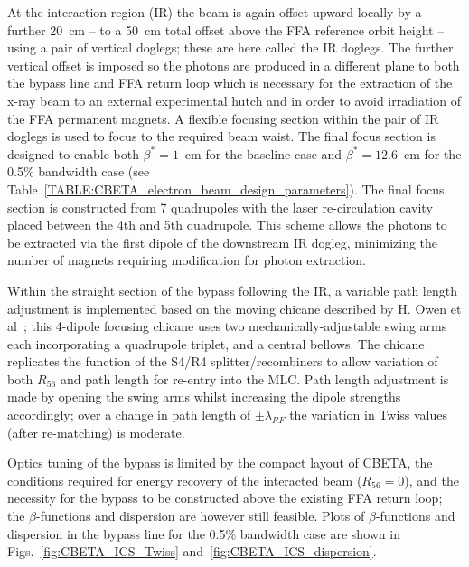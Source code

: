 \documentclass[../main.tex]{subfiles}
\begin{document}
At the interaction region (IR) the beam is again offset upward locally by a further 20~\si{\centi\meter} -- to a 50~\si{\centi\meter} total offset above the FFA reference orbit height -- using a pair of vertical doglegs; these are here called the IR doglegs. The further vertical offset is imposed so the photons are produced in a different plane to both the bypass line and FFA return loop which is necessary for the extraction of the x-ray beam to an external experimental hutch and in order to avoid irradiation of the FFA permanent magnets. A flexible focusing section within the pair of IR doglegs is used to focus to the required beam waist. The final focus section is designed to enable both $\beta^{*} = 1$~\si{\centi\meter} for the baseline case and $\beta^{*} = 12.6$~\si{\centi\meter} for the 0.5\% bandwidth case (see Table~\ref{TABLE:CBETA_electron_beam_design_parameters}). The final focus section is constructed from 7 quadrupoles with the laser re-circulation cavity placed between the 4th and 5th quadrupole. This scheme allows the photons to be extracted via the first dipole of the downstream IR dogleg, minimizing the number of magnets requiring modification for photon extraction. 

Within the straight section of the bypass following the IR, a variable path length adjustment is implemented based on the moving chicane described by H. Owen et al~\cite{owen2012modular}; this 4-dipole focusing chicane uses two mechanically-adjustable swing arms each incorporating a quadrupole triplet, and a central bellows. The chicane replicates the function of the S4/R4 splitter/recombiners to allow variation of both $R_{56}$ and path length for re-entry into the MLC. Path length adjustment is made by opening the swing arms whilst increasing the dipole strengths accordingly; over a change in path length of $\pm\lambda_{RF}$ the variation in Twiss values (after re-matching) is moderate.

Optics tuning of the bypass is limited by the compact layout of CBETA, the conditions required for energy recovery of the interacted beam ($R_{56}=0$), and the necessity for the bypass to be constructed above the existing FFA return loop; the $\beta$-functions and dispersion are however still feasible. Plots of $\beta$-functions and dispersion in the bypass line for the 0.5\% bandwidth case are shown in Figs.~\ref{fig:CBETA_ICS_Twiss} and~\ref{fig:CBETA_ICS_dispersion}. 
\end{document}
